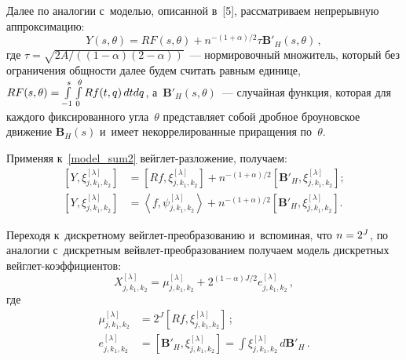 \begin{multicols}{2}
Далее по аналогии с~моделью, описанной в~[5],
рассматриваем непрерывную аппроксимацию:
\begin{equation}
Y(s,\theta) = R F(s,\theta) + n^{-(1+\alpha)/2} \tau \mathbf{B'}_H(s,\theta)\,,
\label{model_sum2}
\end{equation}
где $\tau = \sqrt{{2A}/({(1-\alpha)(2-\alpha)})}$~--- нормировочный множитель,
который без ограничения общности далее будем считать равным единице,
$R F(s,\theta)\hm=\int\limits_{-1}^{s}\int\limits_{0}^{\theta}Rf(t,q)\,dtdq$,
а~$\mathbf{B'}_H(s,\theta)$~--- случайная функция, которая для каждого
фиксированного угла~$\theta$ представляет собой дробное броуновское
движение $\mathbf{B}_H(s)$ и~имеет некоррелированные приращения по~$\theta$.

Применяя к~\eqref{model_sum2} вейглет-раз\-ло\-же\-ние, получаем:
\begin{align*}
\left[Y, \xi_{j,k_1,k_2}^{[\lambda]}\right] &\!\!= \!
\left[R f, \xi_{j,k_1,k_2}^{[\lambda]}\right]\! \!+\! n^{-(1+\alpha)/2}
\left[ \mathbf{B'}_H, \xi_{j,k_1,k_2}^{[\lambda]}\right]\!;\\
\left[Y, \xi_{j,k_1,k_2}^{[\lambda]}\right] &\!\!= \!
\left\langle f, \psi_{j,k_1,k_2}^{[\lambda]}\right\rangle \!+\! n^{-(1+\alpha)/2}
\left[ \mathbf{B'}_H, \xi_{j,k_1,k_2}^{[\lambda]}\right]\!.
\end{align*}
%

Переходя к~дискретному вейглет-пре\-обра\-зо\-ва\-нию и~вспоминая, что $n\hm=2^J$,
по аналогии с~дискретным вейв\-лет-пре\-обра\-зо\-ва\-ни\-ем
получаем модель дискретных вейг\-лет-ко\-эф\-фи\-ци\-ентов:
\begin{equation*}
X_{j,k_1,k_2}^{[\lambda]} = \mu_{j,k_1,k_2}^{[\lambda]} +
2^{(1-\alpha)J/2} e_{j,k_1,k_2}^{[\lambda]}\,,
\end{equation*}
где
\begin{align*}
\mu_{j,k_1,k_2}^{[\lambda]} &=  2^J\left[Rf, \xi_{j,k_1,k_2}^{[\lambda]}\right]\,;
\\
e_{j,k_1,k_2}^{[\lambda]}&=\left[ \mathbf{B'}_H, \xi_{j,k_1,k_2}^{[\lambda]}\right]
=\int\xi_{j,k_1,k_2}^{[\lambda]}\,d\mathbf{B'}_H\,.
\end{align*}


\end{multicols}
